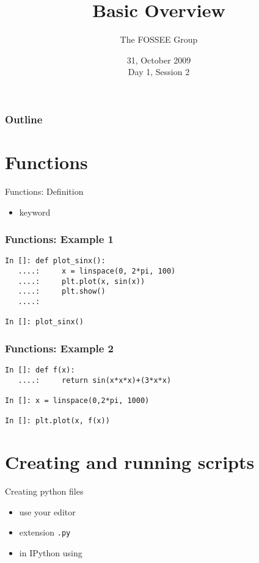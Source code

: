 \documentclass[14pt,compress]{beamer}
\title[Basic Python]{Basic Overview\\}
\author[FOSEE Team] {The FOSSEE Group}
\institute[IIT Bombay] {Department of Aerospace Engineering\\IIT Bombay}
\date[] {31, October 2009\\Day 1, Session 2}
\newcounter{time}
\newcommand{\inctime}[1]{\addtocounter{time}{#1}{\tiny \thetime\ m}}
\newcommand{\typ}[1]{\lstinline{#1}}
\newcommand{\kwrd}[1]{ \texttt{\textbf{\color{blue}{#1}}}  }
\begin{document}
\begin{frame}
  \titlepage
\end{frame}

\begin{frame}
  \frametitle{Outline}
  \tableofcontents
\end{frame}

\section{Functions}
\begin{frame}{Functions: Definition}
\begin{itemize}
  \item \kwrd{def} keyword
\end{itemize}
\end{frame}

\begin{frame}[fragile]
\frametitle{Functions: Example 1}
  \begin{lstlisting}
In []: def plot_sinx():
   ....:     x = linspace(0, 2*pi, 100)
   ....:     plt.plot(x, sin(x))
   ....:     plt.show()
   ....:    

In []: plot_sinx()
  \end{lstlisting}
\end{frame}

\begin{frame}[fragile]
\frametitle{Functions: Example 2}
  \begin{lstlisting}
In []: def f(x):
   ....:     return sin(x*x*x)+(3*x*x)

In []: x = linspace(0,2*pi, 1000)

In []: plt.plot(x, f(x))
  \end{lstlisting}
  \inctime{10}
\end{frame}

\section{Creating and running scripts}
\begin{frame}
  {Creating python files}
  \begin{itemize}
    \item use your editor
    \item extension \typ{.py}
    \item in IPython using \kwrd{\%run}
  \end{itemize}
\inctime{5}
\end{frame}
\end{document}
